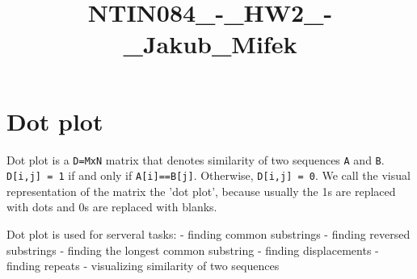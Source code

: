 \documentclass[11pt]{article}
\title{NTIN084\_-\_HW2\_-\_Jakub\_Mifek}
\begin{document}
    
    
    \maketitle
    
    

    
    \section{Dot plot}\label{dot-plot}

Dot plot is a \texttt{D=MxN} matrix that denotes similarity of two
sequences \texttt{A} and \texttt{B}. \texttt{D{[}i,j{]}\ =\ 1} if and
only if \texttt{A{[}i{]}==B{[}j{]}}. Otherwise,
\texttt{D{[}i,j{]}\ =\ 0}. We call the visual representation of the
matrix the 'dot plot', because usually the 1s are replaced with dots and
0s are replaced with blanks.

Dot plot is used for serveral tasks: - finding common substrings -
finding reversed substrings - finding the longest common substring -
finding displacements - finding repeats - visualizing similarity of two
sequences
\end{document}
